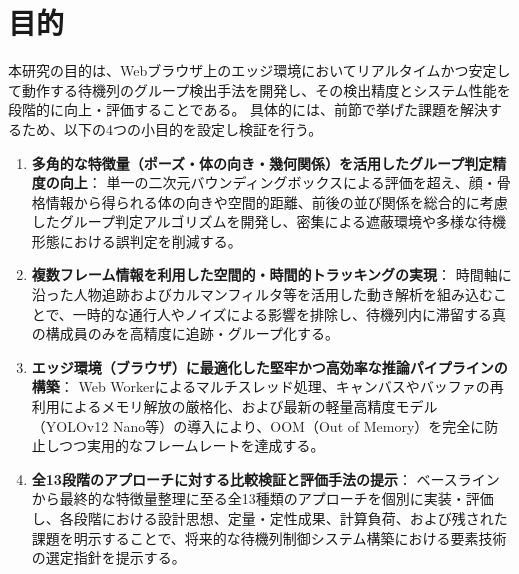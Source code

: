 \section{目的}

本研究の目的は、Webブラウザ上のエッジ環境においてリアルタイムかつ安定して動作する待機列のグループ検出手法を開発し、その検出精度とシステム性能を段階的に向上・評価することである。
具体的には、前節で挙げた課題を解決するため、以下の4つの小目的を設定し検証を行う。

\begin{enumerate}
    \item \textbf{多角的な特徴量（ポーズ・体の向き・幾何関係）を活用したグループ判定精度の向上}：
    単一の二次元バウンディングボックスによる評価を超え、顔・骨格情報から得られる体の向きや空間的距離、前後の並び関係を総合的に考慮したグループ判定アルゴリズムを開発し、密集による遮蔽環境や多様な待機形態における誤判定を削減する。

    \item \textbf{複数フレーム情報を利用した空間的・時間的トラッキングの実現}：
    時間軸に沿った人物追跡およびカルマンフィルタ等を活用した動き解析を組み込むことで、一時的な通行人やノイズによる影響を排除し、待機列内に滞留する真の構成員のみを高精度に追跡・グループ化する。

    \item \textbf{エッジ環境（ブラウザ）に最適化した堅牢かつ高効率な推論パイプラインの構築}：
    Web Workerによるマルチスレッド処理、キャンバスやバッファの再利用によるメモリ解放の厳格化、および最新の軽量高精度モデル（YOLOv12 Nano等）の導入により、OOM（Out of Memory）を完全に防止しつつ実用的なフレームレートを達成する。

    \item \textbf{全13段階のアプローチに対する比較検証と評価手法の提示}：
    ベースラインから最終的な特徴量整理に至る全13種類のアプローチを個別に実装・評価し、各段階における設計思想、定量・定性成果、計算負荷、および残された課題を明示することで、将来的な待機列制御システム構築における要素技術の選定指針を提示する。
\end{enumerate}